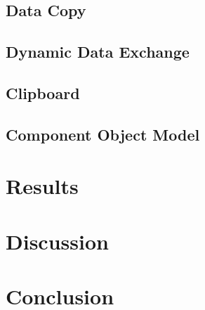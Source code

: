 \documentclass[12pt] {newrucsthesis}    %
\begin{document}
    \section{Data Copy} \label{datacopysection}

    \section{Dynamic Data Exchange} \label{ddesection}

    \section{Clipboard} \label{clipboardsection}

    \section{Component Object Model} \label{comsection}


  \chapter{Results}

  \chapter{Discussion}

  \chapter{Conclusion}

  
  
\end{document}
